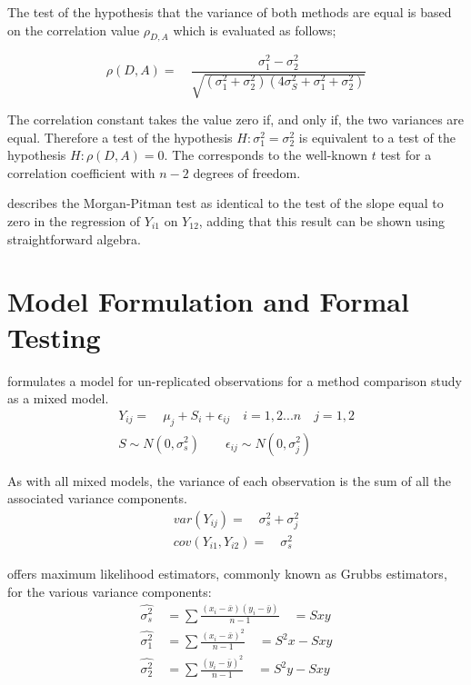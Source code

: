 \documentclass[12pt, a4paper]{article}
\begin{document}
The test of the hypothesis that the variance of both methods are
equal is based on the correlation value $\rho_{D,A}$ which is
evaluated as follows;

\begin{equation}
	\rho(D,A)=\quad\frac{\sigma^{2}_{1}-\sigma^{2}_{2}}{\sqrt{(\sigma^{2}_{1}+\sigma^{2}_{2})(4\sigma^{2}_{S}+\sigma^{2}_{1}+\sigma^{2}_{2})}}
\end{equation}

The correlation constant takes the value zero if, and only if, the
two variances are equal. Therefore a test of the hypothesis $H:
\sigma^{2}_{1}=\sigma^{2}_{2}$ is equivalent to a test of the
hypothesis $H: \rho(D,A) = 0$. The corresponds to the well-known
$t$ test for a correlation coefficient with $n-2$ degrees of
freedom.

\citet{Bartko} describes the Morgan-Pitman test as identical to
the test of the slope equal to zero in the regression of $Y_{i1}$
on $Y_{12}$, adding that this result can be shown using
straightforward algebra.



\section{Model Formulation and Formal Testing}

\citet{Kinsella} formulates a model for un-replicated observations
for a method comparison study as a mixed model.
\begin{eqnarray}
Y_{ij} =\quad \mu_{j} + S_{i} + \epsilon_{ij} \quad i=1,2...n\quad
j=1,2\\
S \sim N(0,\sigma^{2}_{s})\qquad \epsilon_{ij} \sim
N(0,\sigma^{2}_{j}) \nonumber
\end{eqnarray}

As with all mixed models, the variance of each observation is the
sum of all the associated variance components.
\begin{eqnarray}
var(Y_{ij}) =\quad \sigma^{2}_{s} + \sigma^{2}_{j} \\
cov(Y_{i1},Y_{i2})=\quad \sigma^{2}_{s} \nonumber
\end{eqnarray}

\citet{Grubbs48} offers maximum likelihood estimators, commonly
known as Grubbs estimators, for the various variance components:
\begin{eqnarray}
\hat{\sigma^{2}_{s}} \quad= \sum{\frac{(x_{i}-\bar{x})(y_{i}-\bar{y})}{n-1}}\quad=Sxy\\
\hat{\sigma^{2}_{1}} \quad= \sum{\frac{(x_{i}-\bar{x})^{2}}{n-1}} \quad=S^{2}x-Sxy \nonumber\\
\hat{\sigma^{2}_{2}} \quad=
\sum{\frac{(y_{i}-\bar{y})^{2}}{n-1}}\quad=S^{2}y-Sxy \nonumber
\nonumber
\end{eqnarray}
\end{document}
